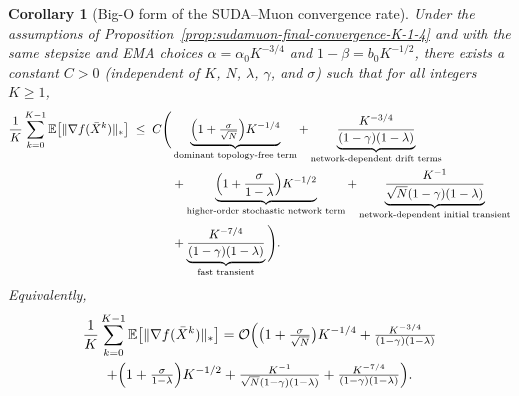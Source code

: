 \documentclass{article}
\newtheorem{corollary}{Corollary}
\begin{document}
\begin{corollary}[Big-O form of the SUDA--Muon convergence rate]
\label{cor:sudamuon-final-convergence-bigO}
Under the assumptions of Proposition~\ref{prop:sudamuon-final-convergence-K-1-4}
and with the same stepsize and EMA choices
$\alpha = \alpha_0 K^{-3/4}$ and $1-\beta = b_0 K^{-1/2}$,
there exists a constant $C>0$ (independent of $K$, $N$, $\lambda$, $\gamma$, and $\sigma$)
such that for all integers $K\ge 1$,
\begin{equation}
\label{eq:sudamuon-final-rate-bigO}
\begin{split}
\frac{1}{K}\sum_{k=0}^{K-1} \mathbb{E}\big[\|\nabla f(\bar X^k)\|_*\big]
\;\le\; C\Bigg(&
\underbrace{\Bigl(1+\tfrac{\sigma}{\sqrt{N}}\Bigr)K^{-1/4}}_{\text{dominant topology-free term}}
+\underbrace{\frac{K^{-3/4}}{(1-\gamma)(1-\lambda)}}_{\text{network-dependent drift terms}}
\\
&+\underbrace{\Bigl(1+\frac{\sigma}{1-\lambda}\Bigr)K^{-1/2}}_{\text{higher-order stochastic network term}}
+\underbrace{\frac{K^{-1}}{\sqrt{N}(1-\gamma)(1-\lambda)}}_{\text{network-dependent initial transient}}
\\
&+\underbrace{\frac{K^{-7/4}}{(1-\gamma)(1-\lambda)}}_{\text{fast transient}}
\Bigg).
\end{split}
\end{equation}
Equivalently,
\begin{multline*}
\frac{1}{K}\sum_{k=0}^{K-1} \mathbb{E}\big[\|\nabla f(\bar X^k)\|_*\big]
= \mathcal{O}\Bigl(
\bigl(1+\tfrac{\sigma}{\sqrt{N}}\bigr)K^{-1/4}
+ \tfrac{K^{-3/4}}{(1-\gamma)(1-\lambda)}\\
+ \Bigl(1+\tfrac{\sigma}{1-\lambda}\Bigr)K^{-1/2}
+ \tfrac{K^{-1}}{\sqrt{N}(1-\gamma)(1-\lambda)}
+ \tfrac{K^{-7/4}}{(1-\gamma)(1-\lambda)}
\Bigr).
\end{multline*}
\end{corollary}
\end{document}

